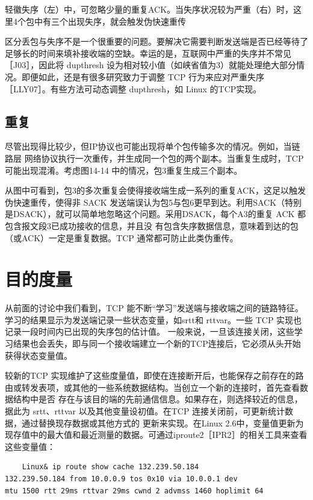 轻徽失序（左）中，可忽略少量的重复ACK。当失序状况较为严重（右）时，这里4个包中有三个出现失序，就会触发伪快速重传

区分丢包与失序不是一个很重要的问题。要解决它需要判断发送端是否已经等待了足够长的时间来填补接收端的空缺。幸运的是，互联网中严重的失序并不常见［J03］，因此将
dupthresh 设为相对较小值（如峡省值为3）就能处理绝大部分情况。即便如此，还是有很多研究致力于调整 TCP 行为来应对严重失序［LLY07］。有些方法可动态调整 dupthresh，如
Linux 的TCP实现。

\subsection{重复}
尽管出现得比较少，但IP协议也可能出现将单个包传输多次的情况。例如，当链路层
网络协议执行一次重传，并生成同一个包的两个副本。当重复生成时，TCP 可能出现混淆。考虑图14-14 中的情况，包3重复生成三个副本。

从图中可看到，包3的多次重复会使得接收端生成一系列的重复ACK，这足以触发伪快速重传，使得非 SACK
发送端误认为包5与包6更早到达。利用SACK（特别是DSACK），就可以简单地忽略这个问题。采用DSACK，每个A3的重复 ACK 都包含报文段3已成功接收的信息，并且没
有包含失序数据信息，意味着到达的包（或ACK）一定是重复数据。TCP 通常都可防止此类伪重传。

\section{目的度量}
从前面的讨论中我们看到，TCP 能不断“学习”发送端与接收端之间的链路特征。学习的结果显示为发送端记录一些状态变量，如srtt和 rttvar。一些 TCP 实现也记录一段时间内已出现的失序包的估计值。
一般来说，一旦该连接关闭，这些学习结果也会丢失，即与同一个接收端建立一个新的TCP连接后，它必须从头开始获得状态变量值。

较新的TCP 实现维护了这些度量值，即使在连接断开后，也能保存之前存在的路由或转发表项，或其他的一些系统数据结构。当创立一个新的连接时，首先查看数据结构中是否
存在与该目的端的先前通信信息。如果存在，则选择较近的信息，据此为 srtt、rttvar 以及其他变量设初值。在TCP 连接关闭前，可更新统计数据，通过替换现存数据或其他方式的
更新来实现。在Linux 2.6中，变量值更新为现存值中的最大值和最近测量的数据。可通过iproute2［IPR2］的相关工具来查看这些变量值：

\begin{verbatim}
    Linux& ip route show cache 132.239.50.184
132.239.50.184 from 10.0.0.9 tos 0x10 via 10.0.0.1 dev
mtu 1500 rtt 29ms rttvar 29ms cwnd 2 advmss 1460 hoplimit 64
\end{verbatim}


